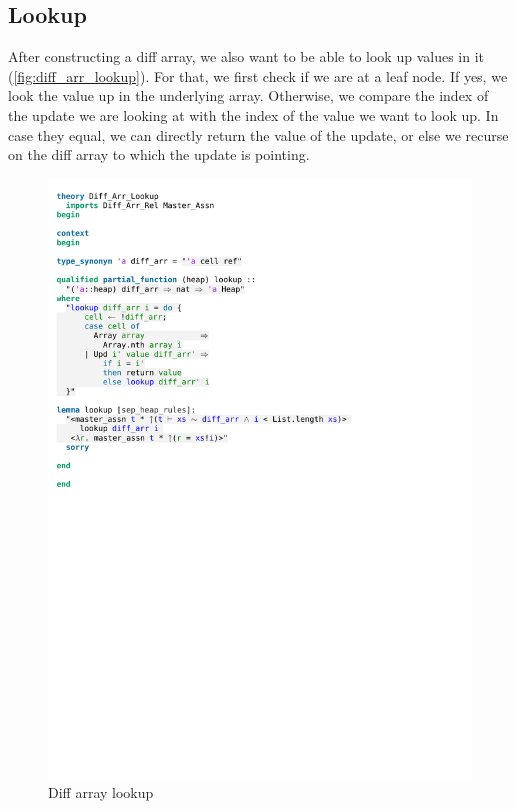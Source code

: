 \subsection{Lookup}

After constructing a diff array, we also want to be able to look up values in it (\autoref{fig:diff_arr_lookup}). For that, we first check if we are at a leaf node. If yes, we look the value up in the underlying array. Otherwise, we compare the index of the update we are looking at with the index of the value we want to look up. In case they equal, we can directly return the value of the update, or else we recurse on the diff array to which the update is pointing.

\begin{figure}[htpb]
    \includegraphics[trim={0 19cm 0 4,8cm}, clip, width=1.00\textwidth]{figures/Theory_Diff_Arr_Lookup.pdf}
    \caption[Diff array lookup]{Diff array lookup}
    \label{fig:diff_arr_lookup}
\end{figure}

